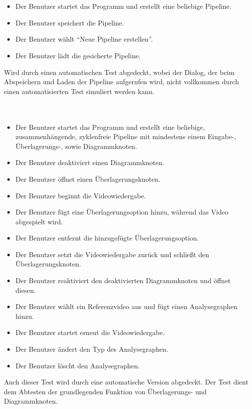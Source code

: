 \paragraph{} ~\\

\begin{itemize}
	\item Der Benutzer startet das Programm und erstellt eine beliebige Pipeline.
	\item Der Benutzer speichert die Pipeline.
	\item Der Benutzer wählt ``Neue Pipeline erstellen''.
	\item Der Benutzer lädt die gesicherte Pipeline.
\end{itemize}

Wird durch einen automatischen Test abgedeckt, wobei der Dialog, der beim Abspeichern und Laden der Pipeline aufgerufen wird, nicht vollkommen durch einen automatisierten Test simuliert werden kann.

\paragraph{}

\paragraph{} ~\\
 
\begin{itemize}
	\item Der Benutzer startet das Programm und erstellt eine beliebige, zusammenhängende, zyklenfreie Pipeline mit mindestens einem Eingabe-, Überlagerungs-, sowie Diagrammknoten.
	\item Der Benutzer deaktiviert einen Diagrammknoten.
	\item Der Benutzer öffnet einen Überlagerungsknoten.
	\item Der Benutzer beginnt die Videowiedergabe.
	\item Der Benutzer fügt eine Überlagerungsoption hinzu, während das Video abgespielt wird.
	\item Der Benutzer entfernt die hinzugefügte Überlagerungsoption.
	\item Der Benutzer setzt die Videowiedergabe zurück und schließt den Überlagerungsknoten.
	\item Der Benutzer reaktiviert den deaktivierten Diagrammknoten und öffnet diesen.
	\item Der Benutzer wählt ein Referenzvideo aus und fügt einen Analysegraphen hinzu.
	\item Der Benutzer startet erneut die Videowiedergabe.
	\item Der Benutzer ändert den Typ des Analysegraphen.
	\item Der Benutzer löscht den Analysegraphen.
\end{itemize}

Auch dieser Test wird durch eine automatische Version abgedeckt. Der Test dient dem Abtesten der grundlegenden Funktion von Überlagerungs- und Diagrammknoten.
